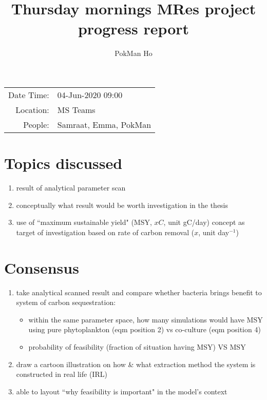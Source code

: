 \documentclass[a4paper,11pt]{article}
\title{Thursday mornings MRes project progress report}
\author{PokMan Ho}
\date{}
\begin{document}
    \maketitle
    
    \begin{tabular}{rl}
        Date Time: & 04-Jun-2020 09:00 \\
        Location: & MS Teams \\
        People: & Samraat, Emma, PokMan \\
    \end{tabular}
    
    \section{Topics discussed}
    \begin{enumerate}
        \item result of analytical parameter scan
        \item conceptually what result would be worth investigation in the thesis
        \item use of ``maximum sustainable yield" (MSY, $xC$, unit gC/day) concept as target of investigation based on rate of carbon removal ($x$, unit day$^{-1}$)
    \end{enumerate}
    
    \section{Consensus}
    \begin{enumerate}
        \item take analytical scanned result and compare whether bacteria brings benefit to system of carbon sequestration:
        \begin{itemize}
            \item within the same parameter space, how many simulations would have MSY using pure phytoplankton (eqm position 2) vs co-culture (eqm position 4)
            \item probability of feasibility (fraction of situation having MSY) VS MSY
        \end{itemize}
        \item draw a cartoon illustration on how \& what extraction method the system is constructed in real life (IRL)
        \item able to layout ``why feasibility is important" in the model's context
    \end{enumerate}
    
\end{document}
